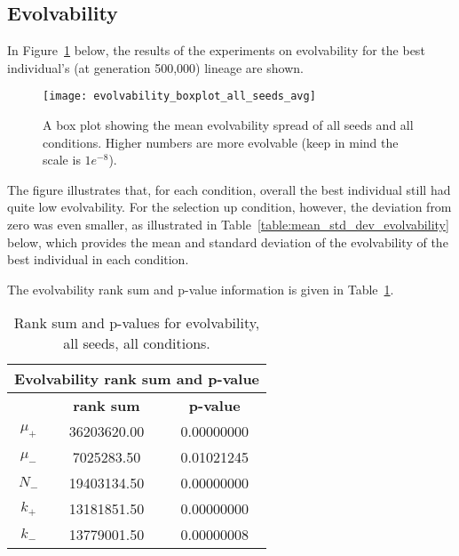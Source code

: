 \subsection{Evolvability}
In Figure~\ref{fig:evolvability_mean} below, the results of the experiments on evolvability for the best individual's (at generation 500,000) lineage are shown. 
\begin{figure}[H]
	\centering
	\texttt{[image: evolvability\_boxplot\_all\_seeds\_avg]}
	\caption[Evolvability boxplot]{A box plot showing the mean evolvability spread of all seeds and all conditions. Higher numbers are more evolvable (keep in mind the scale is $1e^{-8}$). }
	\label{fig:evolvability_mean}	
\end{figure}
The figure illustrates that, for each condition, overall the best individual still had quite low evolvability. For the selection up condition, however, the deviation from zero was even smaller, as illustrated in Table~\ref{table:mean_std_dev_evolvability} below, which provides the mean and standard deviation of the evolvability of the best individual in each condition. 

The evolvability rank sum and p-value information is given in Table~\ref{table:evolvability-rank_sum_and_p-values}.

\begin{table}[H]
	\begin{tabular}{|c|c|c|}
		\hline
		\multicolumn{3}{c}{\Large \textbf{Evolvability rank sum and p-value}} \\
		\hline
		& \textbf{rank sum} & \textbf{p-value} \\
		\hline
		$\mu_+$ & 36203620.00 & 0.00000000 \\ 
		\hline
		$\mu_-$ & 7025283.50 & 0.01021245 \\ 
		\hline
		$N_-$ & 19403134.50 & 0.00000000 \\ 
		\hline
		$k_+$ & 13181851.50 & 0.00000000 \\ 
		\hline
		$k_-$ & 13779001.50 & 0.00000008 \\ 
		\hline
	\end{tabular}
	\caption[Evolvability - rank sum and p-value]{Rank sum and p-values for evolvability, all seeds, all conditions.}
	\label{table:evolvability-rank_sum_and_p-values}
\end{table}

